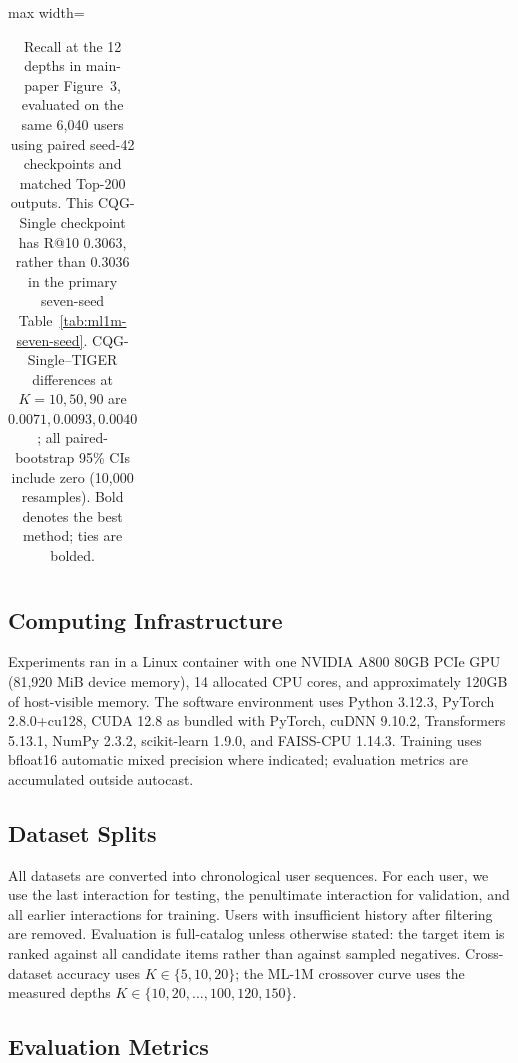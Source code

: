 \documentclass[preprint,12pt]{elsarticle}
\begin{document}
\begin{table}[htbp]
\begin{adjustbox}{max width=\linewidth}
\begin{tabular}{llrrrrrrrrrrrr}
\bottomrule
\end{tabular}
\end{adjustbox}
\caption{Recall at the 12 depths in main-paper Figure~3, evaluated on the
same 6,040 users using paired seed-42 checkpoints and matched Top-200
outputs. This CQG-Single checkpoint has R@10 \(0.3063\), rather than
\(0.3036\) in the primary seven-seed Table~\ref{tab:ml1m-seven-seed}.
CQG-Single--TIGER differences at \(K=10,50,90\) are
\(0.0071,0.0093,0.0040\); all paired-bootstrap 95\% CIs include zero
(10,000 resamples). Bold denotes the best method; ties are bolded.}
\label{tab:crossover}
\end{table}



\subsection{Computing Infrastructure}
\label{app:infrastructure}

Experiments ran in a Linux container with one NVIDIA A800 80GB PCIe GPU
(81,920 MiB device memory), 14 allocated CPU cores, and approximately 120GB
of host-visible memory. The software environment uses Python 3.12.3,
PyTorch 2.8.0+cu128, CUDA 12.8 as bundled with PyTorch, cuDNN 9.10.2,
Transformers 5.13.1, NumPy 2.3.2, scikit-learn 1.9.0, and FAISS-CPU 1.14.3.
Training uses bfloat16 automatic mixed precision where indicated; evaluation
metrics are accumulated outside autocast.

\subsection{Dataset Splits}
\label{app:splits}

All datasets are converted into chronological user sequences. For each user,
we use the last interaction for testing, the penultimate interaction for
validation, and all earlier interactions for training. Users with insufficient
history after filtering are removed. Evaluation is full-catalog unless
otherwise stated: the target item is ranked against all candidate items rather
than against sampled negatives. Cross-dataset accuracy uses
\(K\in\{5,10,20\}\); the ML-1M crossover curve uses the measured depths
\(K\in\{10,20,\ldots,100,120,150\}\).

\subsection{Evaluation Metrics}
\label{app:metrics}
\end{document}
